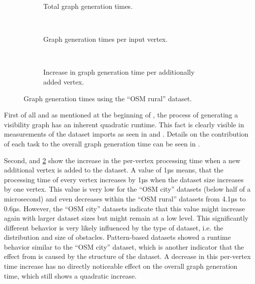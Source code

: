 \begin{figure}[h!]
\begin{minipage}{.48\textwidth}
\begin{subfigure}[t]{\linewidth}
						\caption{Total graph generation times.}
						\label{fig:eval-import-rural-abs}
					\end{subfigure}
					\\[3ex]
					\begin{subfigure}[t]{\linewidth}
						\begin{figcenter}
							
						\end{figcenter}
						\caption{Graph generation times per input vertex.}
					\end{subfigure}
					\\[3ex]
					\begin{subfigure}[t]{\linewidth}
						\begin{figcenter}
							
						\end{figcenter}
						\caption{Increase in graph generation time per additionally added vertex.}
						\label{fig:eval-import-rural-rel-increase}
					\end{subfigure}
					\caption{Graph generation times using the \enquote{OSM rural} dataset.}
					\label{fig:eval-import-rural}
				\end{minipage}
			\end{figure}
			
			First of all and as mentioned at the beginning of , the process of generating a visibility graph has an inherent quadratic runtime.
			This fact is clearly visible in measurements of the dataset imports as seen in  and .
			Details on the contribution of each task to the overall graph generation time can be seen in .
			
			Second,  and \ref{fig:eval-import-rural-rel-increase} show the increase in the per-vertex processing time when a new additional vertex is added to the dataset.
			A value of 1µs means, that the processing time of every vertex increases by 1µs when the dataset size increases by one vertex.
			This value is very low for the \enquote{OSM city} datasets (below half of a microsecond) and even decreases within the \enquote{OSM rural} datasets from 4.1µs to 0.6µs.
			However, the \enquote{OSM city} datasets indicate that this value might increase again with larger dataset sizes but might remain at a low level.
			This significantly different behavior is very likely influenced by the type of dataset, i.e. the distribution and size of obstacles.
			Pattern-based datasets showed a runtime behavior similar to the \enquote{OSM city} dataset, which is another indicator that the effect from  is caused by the structure of the dataset.
			A decrease in this per-vertex time increase has no directly noticeable effect on the overall graph generation time, which still shows a quadratic increase.
			
